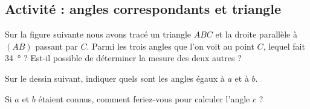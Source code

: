 
\subsection*{Activité : angles correspondants et triangle}

Sur la figure suivante nous avons tracé un triangle \( ABC\) et la droite parallèle à \( (AB)\) passant par \( C\). Parmi les trois angles que l'on voit au point \( C\), lequel fait \SI{34}{\degree} ? Est-il possible de déterminer la mesure des deux autres ?


\begin{center}
   
\end{center}

Sur le dessin suivant, indiquer quels sont les angles égaux à \( a\) et à \( b\). 
\begin{center}
    
\end{center}
Si \( a\) et \( b\) étaient connus, comment feriez-vous pour calculer l'angle \( c\) ?
